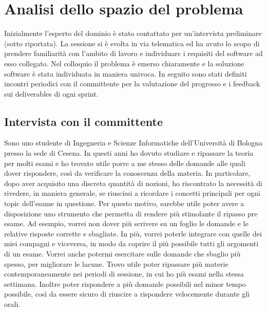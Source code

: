 \chapter{Analisi dello spazio del problema}

Inizialmente l'esperto del dominio è stato contattato per un'intervista preliminare (sotto riportata).
La sessione si è svolta in via telematica ed ha avuto lo scopo di prendere familiarità con l'ambito di lavoro e individuare i requisiti del software ad esso collegato. 
Nel colloquio il problema è emerso chiaramente e la soluzione software è stata individuata in maniera univoca.
In seguito sono stati definiti incontri periodici con il committente per la valutazione del progresso e i feedback sui deliverables di ogni sprint.

	\section{Intervista con il committente}
    
    Sono uno studente di Ingegneria e Scienze Informatiche dell'Università di Bologna presso la sede di Cesena. In questi anni ho dovuto studiare e ripassare la teoria per molti esami e ho trovato utile porre a me stesso delle domande alle quali dover rispondere, così da verificare la conoscenza della materia.
    In particolare, dopo aver acquisito una discreta quantità di nozioni, ho riscontrato la necessità di rivedere, in maniera generale, se riuscissi a ricordare i concetti principali per ogni topic dell'esame in questione.
    Per questo motivo, sarebbe utile poter avere a disposizione uno strumento che permetta di rendere più stimolante il ripasso pre esame. Ad esempio, vorrei non dover più scrivere su un foglio le domande e le relative risposte corrette e sbagliate. In più, vorrei poterle integrare con quelle dei miei compagni e viceversa, in modo da coprire il più possibile tutti gli argomenti di un esame. Vorrei anche potermi esercitare sulle domande che sbaglio più spesso, per migliorare le lacune. Trovo utile poter ripassare più materie contemporaneamente nei periodi di sessione, in cui ho più esami nella stessa settimana. Inoltre poter rispondere a più domande possibili nel minor tempo possibile, così da essere sicuro di riuscire a rispondere velocemente durante gli orali.
    

